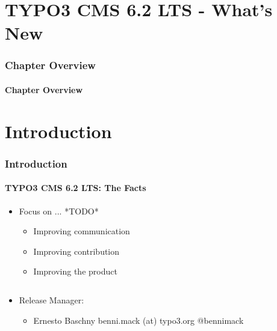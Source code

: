 \section*{TYPO3 CMS 6.2 LTS - What's New}
\begin{frame}[fragile]
	\frametitle{Chapter Overview}
	\framesubtitle{Chapter Overview}

	\begin{multicols}{2}
		\tableofcontents
	\end{multicols}

\end{frame}



\section{Introduction}
\begin{frame}[fragile]
	\frametitle{Introduction}
	\framesubtitle{TYPO3 CMS 6.2 LTS: The Facts}

	\begin{itemize}
		\item Focus on ... *TODO*
		\begin{itemize}
			\item Improving communication
			\item Improving contribution
			\item Improving the product
		\end{itemize}
	\end{itemize}

	\begin{columns}[T]

		\begin{column}{.5\textwidth}
			\begin{itemize}
				\item Release Manager:
				\begin{itemize}
					\item Ernesto Baschny\newline
						benni.mack (at) typo3.org\newline
						@bennimack
				\end{itemize}
			\end{itemize}
		\end{column}

		\begin{column}{.5\textwidth}
		\end{column}

	\end{columns}

\end{frame}

